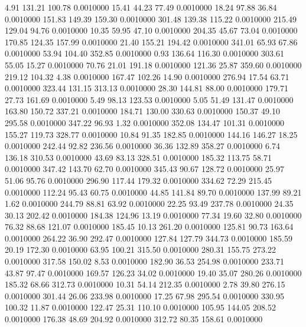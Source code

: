    4.91  131.21  100.78   0.0010000
  15.41   44.23   77.49   0.0010000
  18.24   97.88   36.84   0.0010000
 151.83  149.39  159.30   0.0010000
 301.48  139.38  115.22   0.0010000
 215.49  129.04   94.76   0.0010000
  10.35   59.95   47.10   0.0010000
 204.35   45.67   73.04   0.0010000
 170.85  124.35  157.99   0.0010000
  21.40  155.21  194.42   0.0010000
 341.01   65.93   67.86   0.0010000
  53.94  104.40  352.85   0.0010000
   0.93  136.64  116.30   0.0010000
 303.61   55.05   15.27   0.0010000
  70.76   21.01  191.18   0.0010000
 121.36   25.87  359.60   0.0010000
 219.12  104.32    4.38   0.0010000
 167.47  102.26   14.90   0.0010000
 276.94   17.54   63.71   0.0010000
 323.44  131.15  313.13   0.0010000
  28.30  144.81   88.00   0.0010000
 179.71   27.73  161.69   0.0010000
   5.49   98.13  123.53   0.0010000
   5.05   51.49  131.47   0.0010000
 163.80  150.72  337.21   0.0010000
 184.71  130.00  330.63   0.0010000
 150.37   49.10  295.58   0.0010000
 347.22   96.93    1.32   0.0010000
 352.08  134.47  101.31   0.0010000
 155.27  119.73  328.77   0.0010000
  10.84   91.35  182.85   0.0010000
 144.16  146.27   18.25   0.0010000
 242.44   92.82  236.56   0.0010000
  36.36  132.89  358.27   0.0010000
   6.74  136.18  310.53   0.0010000
  43.69   83.13  328.51   0.0010000
 185.32  113.75   58.71   0.0010000
 347.42  143.70   62.70   0.0010000
 345.43   90.67  128.72   0.0010000
  25.97   51.06   95.76   0.0010000
 296.90  117.44  179.32   0.0010000
 334.62   72.29  215.45   0.0010000
 112.24   95.43   60.75   0.0010000
  44.85  141.84   89.70   0.0010000
 137.99   89.21    1.62   0.0010000
 244.79   88.81   63.92   0.0010000
  22.25   93.49  237.78   0.0010000
  24.35   30.13  202.42   0.0010000
 184.38  124.96   13.19   0.0010000
  77.34   19.60   32.80   0.0010000
  76.32   88.68  121.07   0.0010000
 185.45   10.13  261.20   0.0010000
 125.81   90.73  163.64   0.0010000
 264.22   36.90  292.47   0.0010000
 127.84  127.79  344.73   0.0010000
 185.59   20.19  172.30   0.0010000
  63.95  100.21  315.50   0.0010000
 280.31  155.75  273.22   0.0010000
 317.58  150.02    8.53   0.0010000
 182.90   36.53  254.98   0.0010000
 233.71   43.87   97.47   0.0010000
 169.57  126.23   34.02   0.0010000
  19.40   35.07  280.26   0.0010000
 185.32   68.66  312.73   0.0010000
  10.31   54.14  212.35   0.0010000
   2.78   39.80  276.15   0.0010000
 301.44   26.06  233.98   0.0010000
  17.25   67.98  295.54   0.0010000
 330.95  100.32   11.87   0.0010000
 122.47   25.31  110.10   0.0010000
 105.95  144.05  208.52   0.0010000
 176.38   48.69  204.92   0.0010000
 312.72   80.35  158.61   0.0010000
